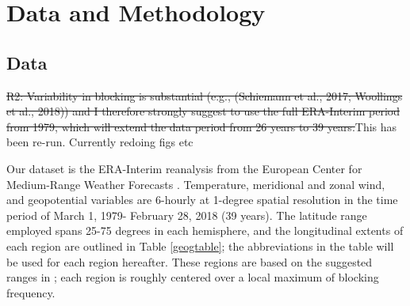 \documentclass[smallextended]{svjour3}       %
\numberwithin{equation}{section}
\begin{document}
\section{Data and Methodology}
\label{dataandmet}

\subsection{Data}\label{datasec}

{\color{teal} \sout{R2: Variability in blocking is substantial (e.g., (Schiemann et al., 2017; Woollings et al., 2018)) and I therefore strongly suggest to use the full ERA-Interim period from 1979, which will extend the data period from 26 years to 39 years.}}{\color{blue}This has been re-run. Currently redoing figs etc}

Our dataset is the ERA-Interim reanalysis from the European Center for Medium-Range Weather Forecasts \citep{dee_era-interim_2011}. Temperature, meridional and zonal wind, and geopotential variables are 6-hourly at 1-degree spatial resolution in the time period of March 1, 1979- February 28, 2018 (39 years). The latitude range employed spans 25-75 degrees in each hemisphere, and the longitudinal extents of each region are outlined in Table \ref{geogtable}; the abbreviations in the table will be used for each region hereafter. These regions are based on the suggested ranges in \cite{wiedenmann_climatology_2002}; each region is roughly centered over a local maximum of blocking frequency. 

\begin{table}
\caption{Longitudinal extents of study regions;  each region has a latitudinal extent of 25-75 degrees in their respective hemispheres. The regions can be seen outlined on the maps in Figures \ref{avg}-\ref{blockdens}. The two-letter abbreviations will be used to refer to these regions throughout the paper.}
\label{geogtable}
\end{table}
\end{document}
